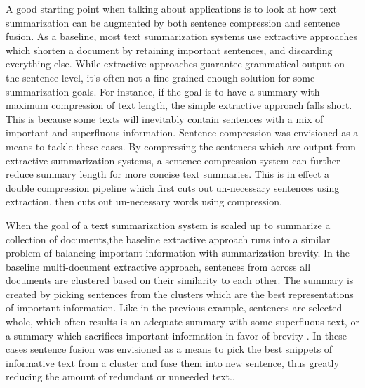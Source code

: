 {{







{A good starting point when talking about applications is to look at how text summarization can be augmented by both sentence compression and sentence fusion.  As a baseline, most text summarization systems use extractive approaches which shorten a document by retaining important sentences, and discarding everything else.  While extractive approaches guarantee grammatical output on the sentence level, it's often not a fine-grained enough solution for some summarization goals.  For instance, if the goal is to have a summary with maximum compression of text length, the simple extractive approach falls short.  This is because some texts will inevitably contain sentences with a mix of important and superfluous information.  Sentence compression was envisioned as a means to tackle these cases.  By compressing the sentences which are output from extractive summarization systems, a sentence compression system can further reduce summary length for more concise text summaries.  This is in effect a double compression pipeline which first cuts out un-necessary sentences using extraction, then cuts out un-necessary words using compression.}

{When the goal of a text summarization system is scaled up to summarize a collection of documents,the baseline extractive approach runs into a similar problem of balancing important information with summarization brevity. In the baseline multi-document extractive approach, sentences from across all documents are clustered based on their similarity to each other.  The summary is created by picking sentences from the clusters which are the best representations of important information.  Like in the previous example, sentences are selected whole, which often results is an adequate summary with some superfluous text, or a summary which sacrifices important information in favor of brevity \citep{Filippova:2008:SFV:1613715.1613741}. In these cases sentence fusion was envisioned as a means to pick the best snippets of informative text from a cluster and fuse them into new sentence, thus greatly reducing the amount of redundant or unneeded text.\citet{bla}.}

}}
